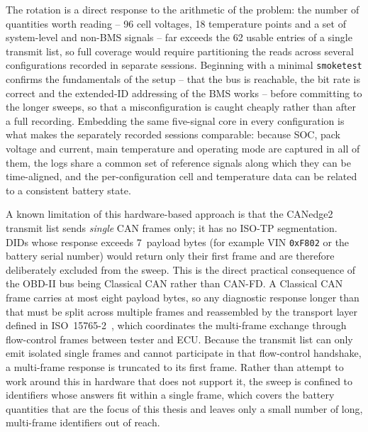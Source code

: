 \documentclass[11pt,a4paper,oneside,parskip=half]{scrreprt}
\providecommand{\hex}{}\renewcommand{\hex}[1]{\texttt{0x#1}}
\begin{document}
The rotation is a direct response to the arithmetic of the problem: the number of quantities worth reading -- 96 cell voltages, 18 temperature points and a set of system-level and non-BMS signals -- far exceeds the 62 usable entries of a single transmit list, so full coverage would require partitioning the reads across several configurations recorded in separate sessions. Beginning with a minimal \texttt{smoketest} confirms the fundamentals of the setup -- that the bus is reachable, the bit rate is correct and the extended-ID addressing of the BMS works -- before committing to the longer sweeps, so that a misconfiguration is caught cheaply rather than after a full recording. Embedding the same five-signal core in every configuration is what makes the separately recorded sessions comparable: because SOC, pack voltage and current, main temperature and operating mode are captured in all of them, the logs share a common set of reference signals along which they can be time-aligned, and the per-configuration cell and temperature data can be related to a consistent battery state.

A known limitation of this hardware-based approach is that the CANedge2 transmit list sends \emph{single} CAN frames only; it has no ISO-TP segmentation. DIDs whose response exceeds 7~payload bytes (for example VIN \hex{F802} or the battery serial number) would return only their first frame and are therefore deliberately excluded from the sweep. This is the direct practical consequence of the OBD-II bus being Classical CAN rather than CAN-FD. A Classical CAN frame carries at most eight payload bytes, so any diagnostic response longer than that must be split across multiple frames and reassembled by the transport layer defined in ISO~15765-2~\cite{iso15765}, which coordinates the multi-frame exchange through flow-control frames between tester and ECU. Because the transmit list can only emit isolated single frames and cannot participate in that flow-control handshake, a multi-frame response is truncated to its first frame. Rather than attempt to work around this in hardware that does not support it, the sweep is confined to identifiers whose answers fit within a single frame, which covers the battery quantities that are the focus of this thesis and leaves only a small number of long, multi-frame identifiers out of reach.


\end{document}
